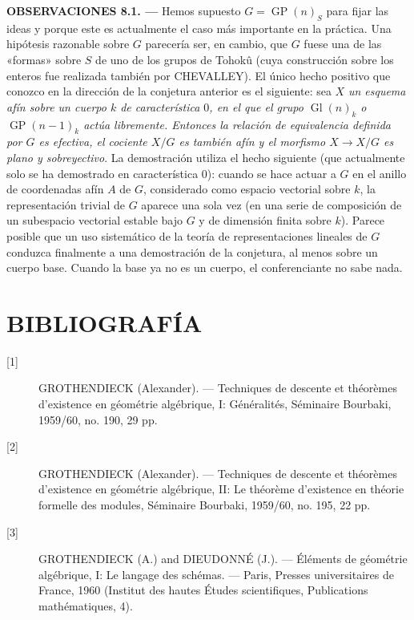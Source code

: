 \medskip
\noindent\textbf{OBSERVACIONES 8.1. ---} Hemos supuesto
$G=\operatorname{GP}(n)_S$ para fijar las ideas y porque este es actualmente
el caso más importante en la práctica. Una hipótesis razonable sobre $G$
parecería ser, en cambio, que $G$ fuese una de las «formas» sobre $S$ de uno
de los grupos de Tohokû (cuya construcción sobre los enteros fue realizada
también por CHEVALLEY). El único hecho positivo que conozco en la dirección de
la conjetura anterior es el siguiente: sea $X$ \emph{un esquema afín sobre un
cuerpo $k$ de característica $0$, en el que el grupo
$\operatorname{Gl}(n)_k$ o $\operatorname{GP}(n-1)_k$ actúa libremente.
Entonces la relación de equivalencia definida por $G$ es efectiva, el
cociente $X/G$ es también afín y el morfismo $X\to X/G$ es plano y
sobreyectivo}. La demostración utiliza el hecho siguiente (que actualmente
solo se ha demostrado en característica $0$): cuando se hace actuar a $G$ en
el anillo de coordenadas afín $A$ de $G$, considerado como espacio vectorial
sobre $k$, la representación trivial de $G$ aparece una sola vez (en una
serie de composición de un subespacio vectorial estable bajo $G$ y de
dimensión finita sobre $k$). Parece posible que un uso sistemático de
la teoría de representaciones lineales de $G$ conduzca finalmente a una
demostración de la conjetura, al menos sobre un cuerpo base. Cuando la base ya
no es un cuerpo, el conferenciante no sabe nada.

\section*{BIBLIOGRAFÍA}

\begin{description}
\item[{[1]}] GROTHENDIECK (Alexander). --- Techniques de descente et théorèmes
d'existence en géométrie algébrique, I: Généralités, Séminaire Bourbaki,
1959/60, no. 190, 29 pp.

\item[{[2]}] GROTHENDIECK (Alexander). --- Techniques de descente et théorèmes
d'existence en géométrie algébrique, II: Le théorème d'existence en théorie
formelle des modules, Séminaire Bourbaki, 1959/60, no. 195, 22 pp.

\item[{[3]}] GROTHENDIECK (A.) and DIEUDONNÉ (J.). --- Éléments de géométrie
algébrique, I: Le langage des schémas. --- Paris, Presses universitaires de
France, 1960 (Institut des hautes Études scientifiques, Publications
mathématiques, 4).
\end{description}
